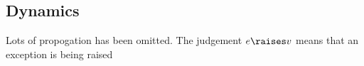 \subsection{Dynamics}
Lots of propogation has been omitted. The judgement $e \raises v$ means that an
exception is being raised

\begin{mathpar}





\end{mathpar}

